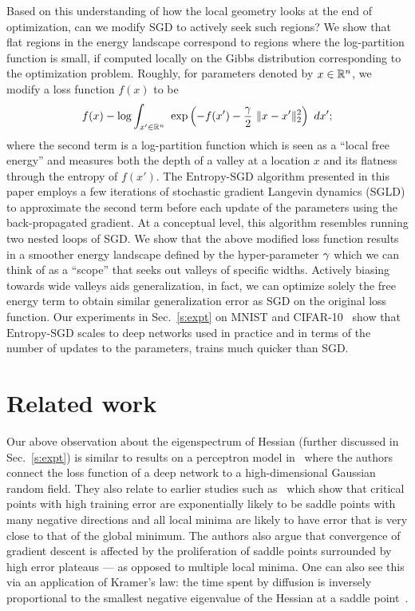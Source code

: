\documentclass[10pt]{article}
\newcommand{\entropysgd}{\mathrm{Entropy}\textrm{-}\mathrm{SGD}}
\begin{document}
Based on this understanding of how the local geometry looks at the end of optimization, can we modify SGD to actively seek such regions? We show that flat regions in the energy landscape correspond to regions where the log-partition function is small, if computed locally on the Gibbs distribution corresponding to the optimization problem. Roughly, for parameters denoted by $x \in \mathbb{R}^n$, we modify a loss function $f(x)$ to be
$$
	f(x) - \log \int_{x' \in \reals^n}\ \exp \rbrac{-f(x') - \f{\g}{2}\ \norm{x-x'}^2_2}\ dx';
$$
where the second term is a log-partition function which is seen as a ``local free energy'' and measures both the depth of a valley at a location $x$ and its flatness through the entropy of $f(x')$. The $\entropysgd$ algorithm presented in this paper employs a few iterations of stochastic gradient Langevin dynamics (SGLD) to approximate the second term before each update of the parameters using the back-propagated gradient. At a conceptual level, this algorithm resembles running two nested loops of SGD. We show that the above modified loss function results in a smoother energy landscape defined by the hyper-parameter $\gamma$ which we can think of as a ``scope'' that seeks out valleys of specific widths. Actively biasing towards wide valleys aids generalization, in fact, we can optimize solely the free energy term to obtain similar generalization error as SGD on the original loss function. Our experiments in Sec.~\ref{s:expt} on MNIST and CIFAR-10~\citep{krizhevsky2009learning} show that $\entropysgd$ scales to deep networks used in practice and in terms of the number of updates to the parameters, trains much quicker than SGD.

\section{Related work}
\label{s:prior_work}

Our above observation about the eigenspectrum of Hessian (further discussed in Sec.~\ref{s:expt}) is similar to results on a perceptron model in~\citet{dauphin2014identifying} where the authors connect the loss function of a deep network to a high-dimensional Gaussian random field. They also relate to earlier studies such as~\citet{Baldi:1989:NNP:70359.70362,Fyodorov2007,Bray2007} which show that critical points with high training error are exponentially likely to be saddle points with many negative directions and all local minima are likely to have error that is very close to that of the global minimum. The authors also argue that convergence of gradient descent is affected by the proliferation of saddle points surrounded by high error plateaus --- as opposed to multiple local minima. One can also see this via an application of Kramer's law: the time spent by diffusion is inversely proportional to the smallest negative eigenvalue of the Hessian at a saddle point~\citep{bovier2006metastability}.
\end{document}
